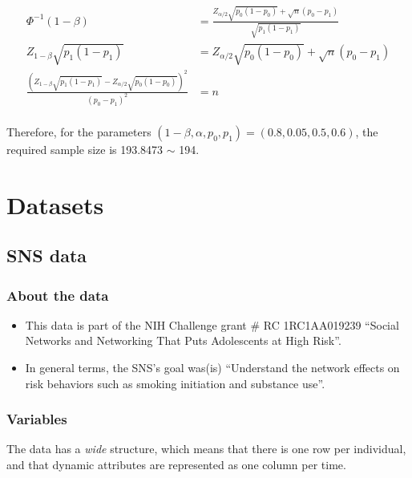 \documentclass[]{book}
\begin{document}
\begin{align*}
\Phi^{-1}(1 - \beta)& = \frac{Z_{\alpha/2}\sqrt{p_0(1-p_0)} + \sqrt{n}(p_0 - p_1)}{\sqrt{p_1(1-p_1)}} \\
Z_{1-\beta}\sqrt{p_1(1-p_1)}& = Z_{\alpha/2}\sqrt{p_0(1-p_0)} + \sqrt{n}(p_0 - p_1) \\
\frac{\left(Z_{1-\beta}\sqrt{p_1(1-p_1)} - Z_{\alpha/2}\sqrt{p_0(1-p_0)}\right)^2}{(p_0 - p_1)^2}& = n \\
\end{align*}

Therefore, for the parameters \((1-\beta, \alpha, p_0, p_1) = (0.8, 0.05, 0.5, 0.6)\), the required sample size is 193.8473 \(\sim\) 194.

\cleardoublepage

\hypertarget{appendix-appendix}{%
\appendix}


\hypertarget{datasets-1}{%
\chapter{Datasets}\label{datasets-1}}

\hypertarget{sns-data}{%
\section{SNS data}\label{sns-data}}

\hypertarget{about-the-data}{%
\subsection{About the data}\label{about-the-data}}

\begin{itemize}
\item
  This data is part of the NIH Challenge grant \# RC 1RC1AA019239 ``Social
  Networks and Networking That Puts Adolescents at High Risk''.
\item
  In general terms, the SNS's goal was(is) ``Understand the network effects on
  risk behaviors such as smoking initiation and substance use''.
\end{itemize}

\hypertarget{variables}{%
\subsection{Variables}\label{variables}}

The data has a \emph{wide} structure, which means that there is one row per individual,
and that dynamic attributes are represented as one column per time.
\end{document}

